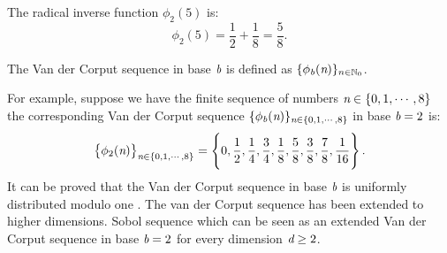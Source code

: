 The radical inverse function $\phi_2(5)$ is:
\begin{equation}
\phi_2 (5) = \frac{1}{2}+\frac{1}{8} = \frac{5}{8}.
\end{equation}
\begin{definition}
The Van der Corput sequence in base $\textit{b}$ is defined as $\{ \phi_{\textit{b}}(\textit{n})\}_{n\in\mathbb{N}_0}$.
\end{definition}
For example, suppose we have the finite sequence of numbers $\textit{n}\in \{0, 1,\cdots, 8\}$  the corresponding Van der Corput sequence 
$\{ \phi_{\textit{b}}(\textit{n})\}_{\textit{n}\in \{0, 1,\cdots, 8\}}$ in base $\textit{b}=2$ is:
\begin{equation}
\big\{\phi_2(\textit{n})\big\}_{\textit{n}\in \{0, 1,\cdots, 8\}} = \Bigg\{0, \frac{1}{2}, \frac{1}{4}, \frac{3}{4}, \frac{1}{8},\frac{5}{8}, \frac{3}{8}, \frac{7}{8}, \frac{1}{16}\Bigg\} \,.
\end{equation}
It can be proved that the Van der Corput sequence in base $\textit{b}$ is uniformly distributed modulo one \cite{leobacher2014introduction}. 
The van der Corput sequence has been extended to higher dimensions. 
Sobol sequence which can be seen as an extended Van der Corput sequence in base $\textit{b}=2$ for every dimension $\textit{d}\geq2$. 
